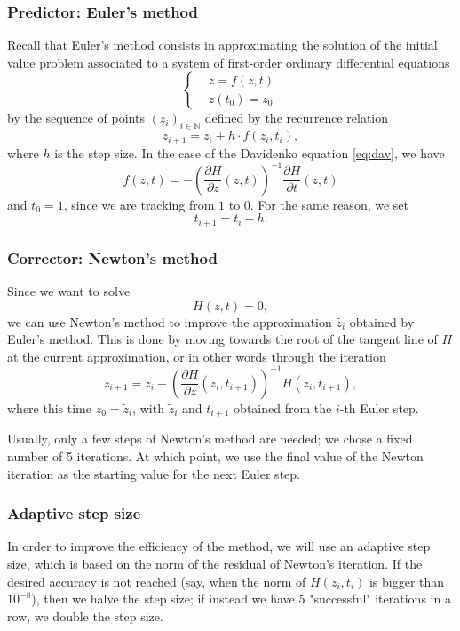 \documentclass[a4paper]{article}
\newcommand{\N}{\mathbb{N}}
\theoremstyle{definition}
\theoremstyle{definition}
\theoremstyle{remark}
\theoremstyle{definition}
\begin{document}
\subsubsection{Predictor: Euler's method}
Recall that Euler's method consists in approximating the solution of the initial value problem associated to a system of first-order ordinary differential equations
\begin{equation*}
    \left\{
        \begin{aligned}
            &\dot{z}=f(z,t)\\
            &z(t_0)=z_0
        \end{aligned}
    \right.
\end{equation*}
by the sequence of points $(z_i)_{i\in\N}$ defined by the recurrence relation
$$ z_{i+1}=z_i+h\cdot f(z_i,t_i) ,$$
where $h$ is the step size.
In the case of the Davidenko equation \eqref{eq:dav}, we have
$$f(z,t)=-\left(\frac{\partial H}{\partial z}(z,t)\right)^{-1}\frac{\partial H}{\partial t}(z,t)$$ and $t_0=1$, since we are tracking from $1$ to $0$. For the same
reason, we set $$t_{i+1}=t_i-h.$$
\subsubsection{Corrector: Newton's method}
Since we want to solve $$H(z,t)=0,$$ we can use Newton's method to improve the approximation $\widetilde{z_i}$ obtained by Euler's method.
This is done by moving towards the root of the tangent line of $H$ at the current approximation, or in other words through the iteration
$$ z_{i+1}=z_i-\left(\frac{\partial H}{\partial z}(z_i,t_{i+1})\right)^{-1}H(z_i,t_{i+1}) ,$$
where this time $z_0=\widetilde{z}_i$, with $\widetilde{z}_i$ and $t_{i+1}$ obtained from the $i$-th Euler step.

Usually, only a few steps of Newton's method are needed; we chose a fixed number of 5 iterations.
At which point, we use the final value of the Newton iteration as the starting value for the next Euler step.
\subsubsection{Adaptive step size}
In order to improve the efficiency of the method, we will use an adaptive step size, which is based on the norm of the residual of Newton's iteration.
If the desired accuracy is not reached (say, when the norm of $H(z_i,t_i)$ is bigger than $10^{-8}$),
then we halve the step size; if instead we have 5 "successful" iterations in a row, we double the step size.
\end{document}
